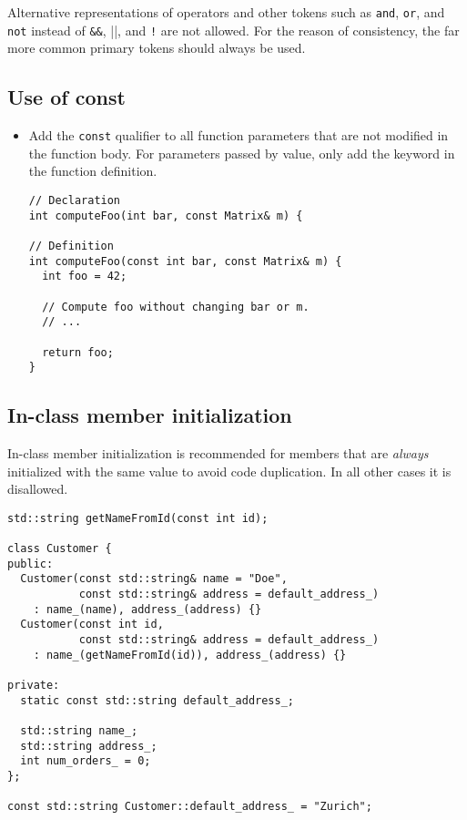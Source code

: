\documentclass[a4paper]{article}
\newcommand{\inlinecode}[1]{\lstinline|#1|}
\begin{document}
Alternative representations of operators and other tokens such as \inlinecode{and}, \inlinecode{or}, and \inlinecode{not} instead of \inlinecode{&&}, \inlinecode{||}, and \inlinecode{!} are not allowed.
For the reason of consistency, the far more common primary tokens should always be used.

\subsection{Use of const}

\begin{itemize}

\item Add the \inlinecode{const} qualifier to all function parameters that are not modified in the function body.
For parameters passed by value, only add the keyword in the function definition.

\begin{lstlisting}[showspaces=false]
// Declaration
int computeFoo(int bar, const Matrix& m) {

// Definition
int computeFoo(const int bar, const Matrix& m) {
  int foo = 42;

  // Compute foo without changing bar or m.
  // ...
	
  return foo;
}
\end{lstlisting}

\end{itemize}

\subsection{In-class member initialization}

In-class member initialization is recommended for members that are \emph{always} initialized with the same value to avoid code duplication.
In all other cases it is disallowed.

\begin{lstlisting}[showspaces=false]
std::string getNameFromId(const int id);

class Customer {
public:
  Customer(const std::string& name = "Doe",
           const std::string& address = default_address_)
    : name_(name), address_(address) {}
  Customer(const int id,
           const std::string& address = default_address_)
    : name_(getNameFromId(id)), address_(address) {}

private:
  static const std::string default_address_;

  std::string name_;
  std::string address_;
  int num_orders_ = 0;
};

const std::string Customer::default_address_ = "Zurich";
\end{lstlisting}
\end{document}
